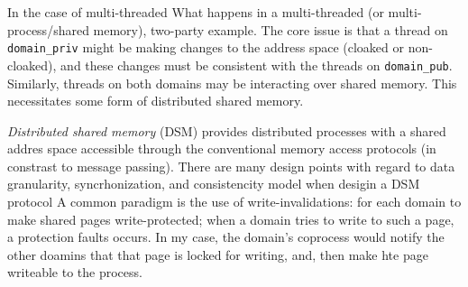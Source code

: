 %
%
%
%
%


%
In the case of multi-threaded 
What happens in a multi-threaded (or multi-process/shared memory), two-party
example.  
%
The core issue is that a thread on \texttt{domain\_priv} might be making changes to
the address space (cloaked or non-cloaked), and these changes must be
consistent with the threads on \texttt{domain\_pub}.
%
Similarly, threads on both domains may be interacting over shared memory.
%
This necessitates some form of distributed shared memory.


\emph{Distributed shared memory} (DSM) provides distributed processes with a
shared addres space accessible through the conventional memory access protocols
(in constrast to message passing).
%
There are many design points with regard to data granularity, syncrhonization,
and consistencity model when desigin a DSM protocol
%
A common paradigm is the use of  write-invalidations: for each domain to make
shared pages write-protected; when a domain tries to write to such a page, a
protection faults occurs.
%
In my case, the domain's coprocess would notify the other doamins that that
page is locked for writing, and, then make hte page writeable to the process.



